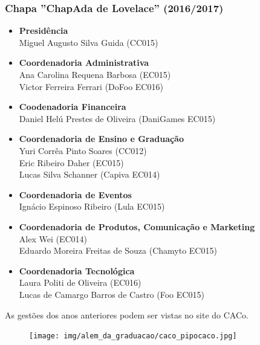\subsubsection{Chapa ''ChapAda de Lovelace'' (2016/2017)}

\begin{itemize}
    \item   \textbf{Presidência}
        \\Miguel Augusto Silva Guida (CC015)

    \item   \textbf{Coordenadoria Administrativa}
        \\Ana Carolina Requena Barbosa (EC015)
        \\Victor Ferreira Ferrari (DoFoo EC016)

    \item   \textbf{Coodenadoria Financeira}
        \\Daniel Helú Prestes de Oliveira (DaniGames EC015)

    \item   \textbf{Coordenadoria de Ensino e Graduação}
        \\Yuri Corrêa Pinto Soares (CC012)
        \\Eric Ribeiro Daher (EC015)
        \\Lucas Silva Schanner (Capiva EC014)
        
    \item   \textbf{Coordenadoria de Eventos}
        \\Ignácio Espinoso Ribeiro (Lula EC015)

    \item   \textbf{Coordenadoria de Produtos, Comunicação e Marketing}
        \\Alex Wei (EC014)
        \\Eduardo Moreira Freitas de Souza (Chamyto EC015)

    \item    \textbf{Coordenadoria Tecnológica}
        \\Laura Politi de Oliveira (EC016)
        \\Lucas de Camargo Barros de Castro (Foo EC015)

\end{itemize}

As gestões dos anos anteriores podem ser vistas no site do CACo.

\begin{figure}[H]
    \centering
    \texttt{[image: img/alem\_da\_graduacao/caco\_pipocaco.jpg]}
\end{figure}
